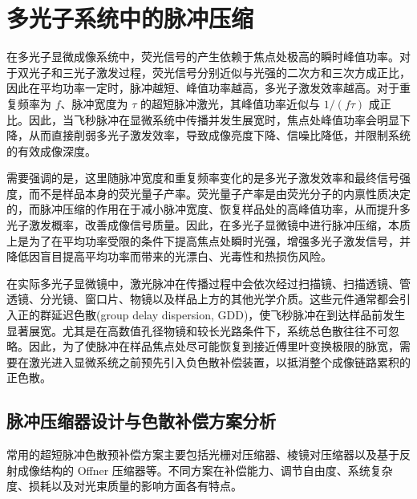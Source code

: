 



\section{多光子系统中的脉冲压缩}\label{4.3}

在多光子显微成像系统中，荧光信号的产生依赖于焦点处极高的瞬时峰值功率。对于双光子和三光子激发过程，荧光信号分别近似与光强的二次方和三次方成正比，因此在平均功率一定时，脉冲越短、峰值功率越高，多光子激发效率越高。对于重复频率为 $f$、脉冲宽度为 $\tau$ 的超短脉冲激光，其峰值功率近似与 $1/(f\tau)$ 成正比。因此，当飞秒脉冲在显微系统中传播并发生展宽时，焦点处峰值功率会明显下降，从而直接削弱多光子激发效率，导致成像亮度下降、信噪比降低，并限制系统的有效成像深度。

需要强调的是，这里随脉冲宽度和重复频率变化的是多光子激发效率和最终信号强度，而不是样品本身的荧光量子产率。荧光量子产率是由荧光分子的内禀性质决定的，而脉冲压缩的作用在于减小脉冲宽度、恢复样品处的高峰值功率，从而提升多光子激发概率，改善成像信号质量。因此，在多光子显微镜中进行脉冲压缩，本质上是为了在平均功率受限的条件下提高焦点处瞬时光强，增强多光子激发信号，并降低因盲目提高平均功率而带来的光漂白、光毒性和热损伤风险。

在实际多光子显微镜中，激光脉冲在传播过程中会依次经过扫描镜、扫描透镜、管透镜、分光镜、窗口片、物镜以及样品上方的其他光学介质。这些元件通常都会引入正的群延迟色散(group delay dispersion, GDD)，使飞秒脉冲在到达样品前发生显著展宽。尤其是在高数值孔径物镜和较长光路条件下，系统总色散往往不可忽略。因此，为了使脉冲在样品焦点处尽可能恢复到接近傅里叶变换极限的脉宽，需要在激光进入显微系统之前预先引入负色散补偿装置，以抵消整个成像链路累积的正色散。



\subsection{脉冲压缩器设计与色散补偿方案分析}\label{4.3.1}

常用的超短脉冲色散预补偿方案主要包括光栅对压缩器、棱镜对压缩器以及基于反射成像结构的 Offner 压缩器等。不同方案在补偿能力、调节自由度、系统复杂度、损耗以及对光束质量的影响方面各有特点。

